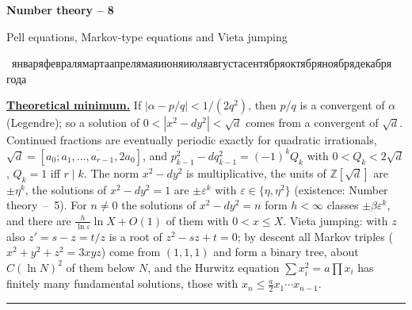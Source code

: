 \documentclass[11pt,a4paper]{article}
\newcommand{\head}[1]{\par\medskip\noindent\textbf{\underline{#1}}\quad}
\newcommand{\rudate}{\number\day~\ifcase\month\or января\or февраля\or марта\or апреля\or мая\or июня\or июля\or августа\or сентября\or октября\or ноября\or декабря\fi~\number\year~года}
\newcommand{\sheettitle}[3]{%
  \begin{center}
  {\huge\bfseries #1\par}\vspace{1.2em}
  {\Large #2\par}\vspace{0.8em}
  \if\relax\detokenize{#3}\relax\else{\Large #3\par}\vspace{0.8em}\fi
  {\foreignlanguage{russian}{\rudate}\par}
  \end{center}\vspace{0.5em}}
\begin{document}
\sheettitle{Number theory -- 8}{Pell equations, Markov-type equations and Vieta jumping}{Homework}

\head{Theoretical minimum.} If $|\alpha-p/q|<1/(2q^2)$, then $p/q$ is a convergent of $\alpha$
(Legendre); so a solution of $0<|x^2-dy^2|<\sqrt d$ comes from a convergent of $\sqrt d$.
Continued fractions are eventually periodic exactly for quadratic irrationals,
$\sqrt d=[a_0;\overline{a_1,\dots,a_{r-1},2a_0}]$, and $p_{k-1}^2-dq_{k-1}^2=(-1)^kQ_k$ with
$0<Q_k<2\sqrt d$, $Q_k=1$ iff $r\mid k$. The norm $x^2-dy^2$ is multiplicative, the units of
$\mathbb Z[\sqrt d]$ are $\pm\eta^k$, the solutions of $x^2-dy^2=1$ are $\pm\varepsilon^k$
with $\varepsilon\in\{\eta,\eta^2\}$ (existence: Number theory~--~5). For $n\neq0$ the
solutions of $x^2-dy^2=n$ form $h<\infty$ classes $\pm\beta\varepsilon^k$, and there are
$\frac{h}{\ln\varepsilon}\ln X+O(1)$ of them with $0<x\leqslant X$. Vieta jumping: with $z$
also $z'=s-z=t/z$ is a root of $z^2-sz+t=0$; by descent all Markov triples
($x^2+y^2+z^2=3xyz$) come from $(1,1,1)$ and form a binary tree, about $C(\ln N)^2$ of them
below $N$, and the Hurwitz equation $\sum x_i^2=a\prod x_i$ has finitely many fundamental
solutions, those with $x_n\leqslant\frac a2x_1\cdots x_{n-1}$.

\medskip\noindent\rule{\linewidth}{0.4pt}
\end{document}
